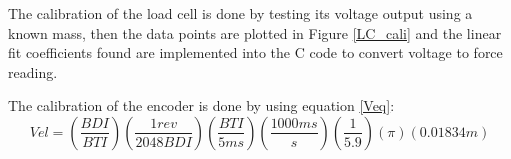 The calibration of the load cell is done by testing its voltage output using a known mass, then the data points are plotted in Figure \ref{LC_cali} and the linear fit coefficients found are implemented into the C code to convert voltage to force reading.\par
The calibration of the encoder is done by using equation \ref{Veq}:
\begin{equation}
\label{Veq}
    Vel=(\frac{BDI}{BTI})(\frac{1 rev}{2048 BDI})(\frac{BTI}{5 ms})(\frac{1000 ms}{s})(\frac{1}{5.9})(\pi)(0.01834 m)
\end{equation}
